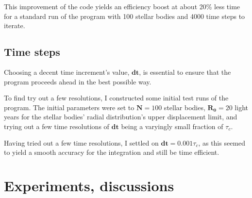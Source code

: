 \documentclass[11pt,a4paper,notitlepage,twocolumn]{article}
\begin{document}
This improvement of the code yields an efficiency boost at about 20\% less time for a standard run of the program with 100 stellar bodies and 4000 time steps to iterate.

\subsection{Time steps}
Choosing a decent time increment's value, $\mathbf{dt}$, is essential to ensure that the program proceeds ahead in the best possible way.

To find try out a few resolutions, I constructed some initial test runs of the program. The initial parameters were set to $\mathbf{N} = 100$ stellar bodies, $\mathbf{R_0} = 20$ light years for the stellar bodies' radial distribution's upper displacement limit, and trying out a few time resolutions of $\mathbf{dt}$ being a varyingly small fraction of $\tau_c$.

Having tried out a few time resolutions, I settled on $\mathbf{dt} = 0.001\tau_c$, as this seemed to yield a smooth accuracy for the integration and still be time efficient.

\section{Experiments, discussions}
\end{document}
